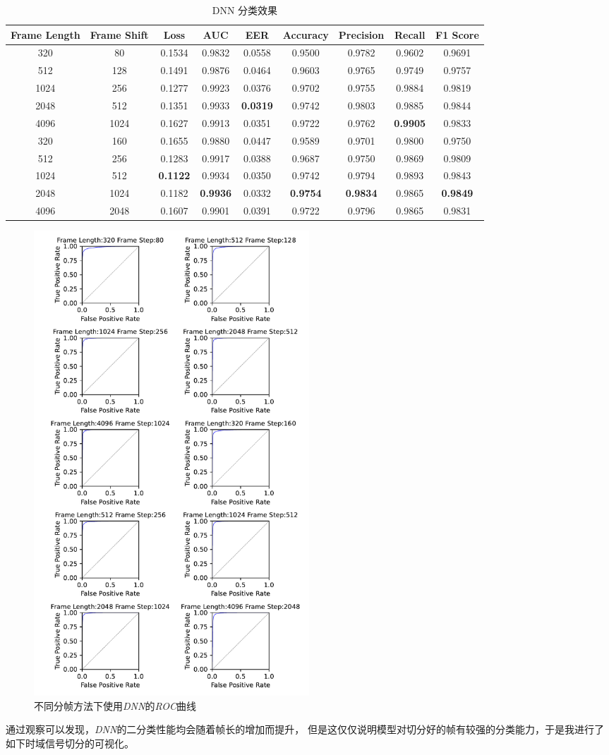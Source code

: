 \documentclass[a4paper]{article}
\begin{document}
\begin{table}[ht]
  \caption{DNN 分类效果}
  \label{tab:DNN}
  \centering
  \begin{tabular}{c|c|c|c|c|c|c|c|c}
    \toprule
    \textbf{Frame Length} & \textbf{Frame Shift} & \textbf{Loss} & \textbf{AUC} & \textbf{EER} & \textbf{Accuracy} & \textbf{Precision} & \textbf{Recall} & \textbf{F1 Score}\\
    \midrule
    320 & 80  & 0.1534 & 0.9832 & 0.0558 & 0.9500 & 0.9782 & 0.9602 & 0.9691 \\
    512 & 128 & 0.1491 & 0.9876 & 0.0464 & 0.9603 & 0.9765 & 0.9749 & 0.9757 \\
    1024 & 256 & 0.1277 & 0.9923 & 0.0376 & 0.9702 & 0.9755 & 0.9884 & 0.9819 \\
    2048 & 512 & 0.1351 & 0.9933 & \textbf{0.0319} & 0.9742 & 0.9803 & 0.9885 & 0.9844 \\
    4096 & 1024 & 0.1627 & 0.9913 & 0.0351 & 0.9722 & 0.9762 & \textbf{0.9905} & 0.9833 \\
    320 & 160 & 0.1655 & 0.9880 & 0.0447 & 0.9589 & 0.9701 & 0.9800 & 0.9750 \\
    512 & 256 & 0.1283 & 0.9917 & 0.0388 & 0.9687 & 0.9750 & 0.9869 & 0.9809 \\
    1024 & 512 & \textbf{0.1122} & 0.9934 & 0.0350 & 0.9742 & 0.9794 & 0.9893 & 0.9843 \\
    2048 & 1024 & 0.1182 & \textbf{0.9936} & 0.0332 & \textbf{0.9754} & \textbf{0.9834} & 0.9865 & \textbf{0.9849} \\
    4096 & 2048 & 0.1607 & 0.9901 & 0.0391 & 0.9722 & 0.9796 & 0.9865 & 0.9831 \\
    \bottomrule
  \end{tabular}
\end{table}

\begin{figure}[ht]
  \centering
  \includegraphics[width=0.5\textwidth]{figs/ROC_DNN.pdf}
  \caption{不同分帧方法下使用\emph{DNN}的\emph{ROC}曲线}
  \label{fig:ROC DNN}
\end{figure}
通过观察可以发现，\emph{DNN}的二分类性能均会随着帧长的增加而提升，
但是这仅仅说明模型对切分好的帧有较强的分类能力，于是我进行了如下时域信号切分的可视化。
\end{document}
